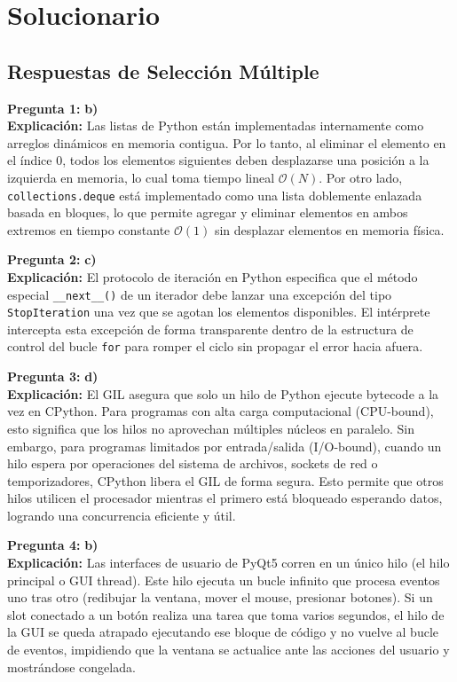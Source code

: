 \documentclass[12pt,letterpaper]{article}
\begin{document}
\pagebreak

\section*{Solucionario}

\subsection*{Respuestas de Selección Múltiple}

\textbf{Pregunta 1:} \textbf{b)} \\
\textbf{Explicación:} Las listas de Python están implementadas internamente como arreglos dinámicos en memoria contigua. Por lo tanto, al eliminar el elemento en el índice 0, todos los elementos siguientes deben desplazarse una posición a la izquierda en memoria, lo cual toma tiempo lineal $\mathcal{O}(N)$. Por otro lado, \texttt{collections.deque} está implementado como una lista doblemente enlazada basada en bloques, lo que permite agregar y eliminar elementos en ambos extremos en tiempo constante $\mathcal{O}(1)$ sin desplazar elementos en memoria física.

\medskip

\textbf{Pregunta 2:} \textbf{c)} \\
\textbf{Explicación:} El protocolo de iteración en Python especifica que el método especial \texttt{\_\_next\_\_()} de un iterador debe lanzar una excepción del tipo \texttt{StopIteration} una vez que se agotan los elementos disponibles. El intérprete intercepta esta excepción de forma transparente dentro de la estructura de control del bucle \texttt{for} para romper el ciclo sin propagar el error hacia afuera.

\medskip

\textbf{Pregunta 3:} \textbf{d)} \\
\textbf{Explicación:} El GIL asegura que solo un hilo de Python ejecute bytecode a la vez en CPython. Para programas con alta carga computacional (CPU-bound), esto significa que los hilos no aprovechan múltiples núcleos en paralelo. Sin embargo, para programas limitados por entrada/salida (I/O-bound), cuando un hilo espera por operaciones del sistema de archivos, sockets de red o temporizadores, CPython libera el GIL de forma segura. Esto permite que otros hilos utilicen el procesador mientras el primero está bloqueado esperando datos, logrando una concurrencia eficiente y útil.

\medskip

\textbf{Pregunta 4:} \textbf{b)} \\
\textbf{Explicación:} Las interfaces de usuario de PyQt5 corren en un único hilo (el hilo principal o GUI thread). Este hilo ejecuta un bucle infinito que procesa eventos uno tras otro (redibujar la ventana, mover el mouse, presionar botones). Si un slot conectado a un botón realiza una tarea que toma varios segundos, el hilo de la GUI se queda atrapado ejecutando ese bloque de código y no vuelve al bucle de eventos, impidiendo que la ventana se actualice ante las acciones del usuario y mostrándose congelada.
\end{document}
